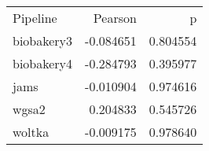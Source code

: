 \begin{tabular}{lrr}
Pipeline & Pearson & p \\
biobakery3 & -0.084651 & 0.804554 \\
biobakery4 & -0.284793 & 0.395977 \\
jams & -0.010904 & 0.974616 \\
wgsa2 & 0.204833 & 0.545726 \\
woltka & -0.009175 & 0.978640 \\
\end{tabular}

